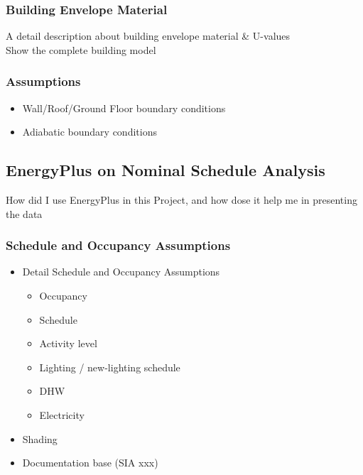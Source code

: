 \documentclass[11pt, a4paper]{article}
\theoremstyle{definition}
\begin{document}
		\subsubsection{Building Envelope Material}
		A detail description about building envelope material \& U-values \\
		Show the complete building model
		
		\subsubsection{Assumptions}
			\begin{itemize}
				\item Wall/Roof/Ground Floor boundary conditions
				\item Adiabatic boundary conditions
			\end{itemize}
			
	\subsection{EnergyPlus on Nominal Schedule Analysis}
		How did I use EnergyPlus in this Project, and how dose it help me in presenting the data
		
		
		\subsubsection{Schedule and Occupancy Assumptions}
			\begin{itemize}
				\item Detail Schedule and Occupancy Assumptions
				\begin{itemize}
					\item Occupancy
					\item Schedule
					\item Activity level
					\item Lighting / new-lighting schedule
					\item DHW
					\item Electricity
				\end{itemize}
				
				\item Shading
				\item Documentation base (SIA xxx)

			\end{itemize}
			
\end{document}
